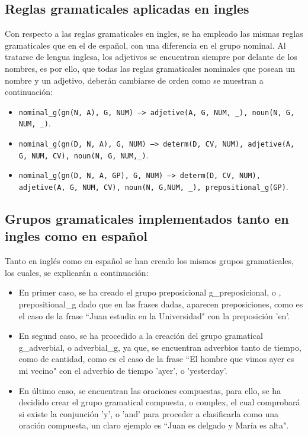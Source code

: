 \documentclass[a4paper]{article}
\begin{document}
    \subsection*{Reglas gramaticales aplicadas en ingles}

        Con respecto a las reglas gramaticales en ingles, se ha empleado las mismas reglas gramaticales    que en el de español, con una diferencia en el grupo nominal. Al tratarse de lengua inglesa, los    adjetivos se encuentran siempre por delante de los nombres, es por ello, que todas las reglas    gramaticales nominales que posean un nombre y un adjetivo, deberán cambiarse de orden como se muestran a continuación:

        \begin{itemize}

            \item \texttt{nominal\_g(gn(N, A), G, NUM) --> adjetive(A, G, NUM, \_), noun(N, G, NUM, \_)}.

            \item \texttt{nominal\_g(gn(D, N, A), G, NUM) --> determ(D, CV, NUM), adjetive(A, G, NUM, CV), noun(N, G, NUM,\_)}.

            \item \texttt{nominal\_g(gn(D, N, A, GP), G, NUM) --> determ(D, CV, NUM), adjetive(A, G, NUM, CV), noun(N, G,NUM, \_), prepositional\_g(GP)}.

        \end{itemize}

    \subsection*{Grupos gramaticales implementados tanto en ingles como en español}

        Tanto en inglés como en español se han creado los mismos grupos gramaticales, los cuales, se explicarán a continuación:

        \begin{itemize}

            \item En primer caso, se ha creado el grupo preposicional g\_preposicional, o , prepositional\_g dado que en las frases dadas, aparecen preposiciones, como es el caso de la frase ``Juan estudia en la Universidad" con la preposición 'en'.

            \item En segund caso, se ha procedido a la creación del grupo gramatical g\_adverbial, o adverbial\_g,      ya que, se encuentran adverbios tanto de tiempo, como de cantidad, como es el caso de la frase ``El hombre que vimos ayer es mi vecino" con el adverbio de tiempo 'ayer', o 'yesterday'.

            \item En último caso, se encuentran las oraciones compuestas, para ello, se ha decidido crear el      grupo gramatical compuesta, o complex, el cual comprobará si existe la conjunción 'y', o 'and' para proceder a clasificarla como una oración compuesta, un claro ejemplo es ``Juan es delgado y María es alta".

        \end{itemize}
\end{document}
